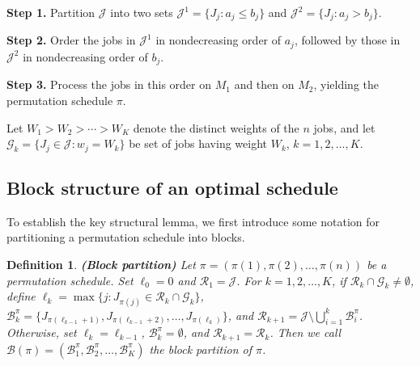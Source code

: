 \documentclass[12pt]{article}
\newtheorem{definition}{Definition}[section]
\begin{document}
\begin{sloppypar}
        \begin{algorithm}[H]
            \small
            \SetAlgoLined
            \DontPrintSemicolon
            \caption{Johnson's rule for $F2\mid\mid C_{\max}$}\label{alg:Johnson}
            \BlankLine
            \textbf{Step 1.} Partition $\mathcal{J}$ into two sets $\mathcal{J}^1=\{J_j: a_j \leq b_j\}$ 
            and $\mathcal{J}^2=\{J_j: a_j>b_j\}$.
            
            \textbf{Step 2.} Order the jobs in $\mathcal{J}^1$ in nondecreasing order of $a_j$, followed by those in $\mathcal{J}^2$ in nondecreasing order of $b_j$. \;
            
            \textbf{Step 3.} Process the jobs in this order on $M_1$ and then on $M_2$, yielding the permutation schedule $\pi$. \;
            
        \end{algorithm}
        
        Let $W_1 > W_2 > \cdots > W_K$ denote the distinct weights of the $n$ jobs, and let $\mathcal{G}_k = \{J_j \in \mathcal{J}: w_j = W_k\}$ be set of jobs having weight $W_k$, $k=1, 2,\ldots, K$. 
        
        \subsection{Block structure of an optimal schedule} \label{sec-block} 
        
        To establish the key structural lemma, we first introduce some notation for partitioning a permutation schedule into blocks. 
        \begin{definition} \label{def:block}
            \textbf{(Block partition)} Let $\pi = (\pi(1), \pi(2), \ldots, \pi(n))$ be a permutation schedule. Set $\ell_0 = 0$ and $\mathcal{R}_1=\mathcal{J}$. For $k = 1, 2, \ldots, K$, if $\mathcal{R}_k \cap \mathcal{G}_k \neq \emptyset$, define $\ell_k=\max \{j: J_{\pi(j)} \in \mathcal{R}_k \cap \mathcal{G}_k\}$, $\mathcal{B}_k^{\pi} = \{J_{\pi(\ell_{k-1}+1)}, J_{\pi(\ell_{k-1}+2)}, \ldots, J_{\pi(\ell_k)}\}$, and $\mathcal{R}_{k+1}=\mathcal{J}\setminus\bigcup_{i=1}^{k}\mathcal{B}_i^{\pi}$. Otherwise, set $\ell_k=\ell_{k-1}$,  $\mathcal{B}_k^{\pi} =\emptyset$, and $\mathcal{R}_{k+1}=\mathcal{R}_{k}$. Then we call $\mathcal{B}(\pi)=(\mathcal{B}_1^{\pi}, \mathcal{B}_2^{\pi}, \ldots, \mathcal{B}_K^{\pi})$ the block partition of $\pi$.
        \end{definition}
        

\end{sloppypar}
\end{document}
